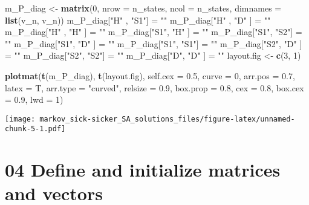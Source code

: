 \documentclass[
]{article}
\newenvironment{Shaded}{\begin{snugshade}}{\end{snugshade}}
\newcommand{\DataTypeTok}[1]{\textcolor[rgb]{0.13,0.29,0.53}{#1}}
\newcommand{\DecValTok}[1]{\textcolor[rgb]{0.00,0.00,0.81}{#1}}
\newcommand{\FloatTok}[1]{\textcolor[rgb]{0.00,0.00,0.81}{#1}}
\newcommand{\KeywordTok}[1]{\textcolor[rgb]{0.13,0.29,0.53}{\textbf{#1}}}
\newcommand{\NormalTok}[1]{#1}
\newcommand{\StringTok}[1]{\textcolor[rgb]{0.31,0.60,0.02}{#1}}
\begin{document}
\begin{Shaded}
\begin{Highlighting}[]
\NormalTok{m_P_diag <-}\StringTok{ }\KeywordTok{matrix}\NormalTok{(}\DecValTok{0}\NormalTok{, }\DataTypeTok{nrow =}\NormalTok{ n_states, }\DataTypeTok{ncol =}\NormalTok{ n_states, }\DataTypeTok{dimnames =} \KeywordTok{list}\NormalTok{(v_n, v_n))}
\NormalTok{m_P_diag[}\StringTok{"H"}\NormalTok{ , }\StringTok{"S1"}\NormalTok{] =}\StringTok{ ""} 
\NormalTok{m_P_diag[}\StringTok{"H"}\NormalTok{ , }\StringTok{"D"}\NormalTok{ ] =}\StringTok{ ""} 
\NormalTok{m_P_diag[}\StringTok{"H"}\NormalTok{ , }\StringTok{"H"}\NormalTok{ ] =}\StringTok{ ""} 
\NormalTok{m_P_diag[}\StringTok{"S1"}\NormalTok{, }\StringTok{"H"}\NormalTok{ ] =}\StringTok{ ""} 
\NormalTok{m_P_diag[}\StringTok{"S1"}\NormalTok{, }\StringTok{"S2"}\NormalTok{] =}\StringTok{ ""} 
\NormalTok{m_P_diag[}\StringTok{"S1"}\NormalTok{, }\StringTok{"D"}\NormalTok{ ] =}\StringTok{ ""} 
\NormalTok{m_P_diag[}\StringTok{"S1"}\NormalTok{, }\StringTok{"S1"}\NormalTok{] =}\StringTok{ ""} 
\NormalTok{m_P_diag[}\StringTok{"S2"}\NormalTok{, }\StringTok{"D"}\NormalTok{ ] =}\StringTok{ ""} 
\NormalTok{m_P_diag[}\StringTok{"S2"}\NormalTok{, }\StringTok{"S2"}\NormalTok{] =}\StringTok{ ""} 
\NormalTok{m_P_diag[}\StringTok{"D"}\NormalTok{, }\StringTok{"D"}\NormalTok{  ] =}\StringTok{ ""} 
\NormalTok{layout.fig <-}\StringTok{ }\KeywordTok{c}\NormalTok{(}\DecValTok{3}\NormalTok{, }\DecValTok{1}\NormalTok{)}

\KeywordTok{plotmat}\NormalTok{(}\KeywordTok{t}\NormalTok{(m_P_diag), }\KeywordTok{t}\NormalTok{(layout.fig), }\DataTypeTok{self.cex =} \FloatTok{0.5}\NormalTok{, }\DataTypeTok{curve =} \DecValTok{0}\NormalTok{, }\DataTypeTok{arr.pos =} \FloatTok{0.7}\NormalTok{,  }
        \DataTypeTok{latex =}\NormalTok{ T, }\DataTypeTok{arr.type =} \StringTok{"curved"}\NormalTok{, }\DataTypeTok{relsize =} \FloatTok{0.9}\NormalTok{, }\DataTypeTok{box.prop =} \FloatTok{0.8}\NormalTok{, }
        \DataTypeTok{cex =} \FloatTok{0.8}\NormalTok{, }\DataTypeTok{box.cex =} \FloatTok{0.9}\NormalTok{, }\DataTypeTok{lwd =} \DecValTok{1}\NormalTok{)}
\end{Highlighting}
\end{Shaded}

\texttt{[image: markov\_sick-sicker\_SA\_solutions\_files/figure-latex/unnamed-chunk-5-1.pdf]}

\hypertarget{define-and-initialize-matrices-and-vectors}{%
\section{04 Define and initialize matrices and
vectors}\label{define-and-initialize-matrices-and-vectors}}
\end{document}
